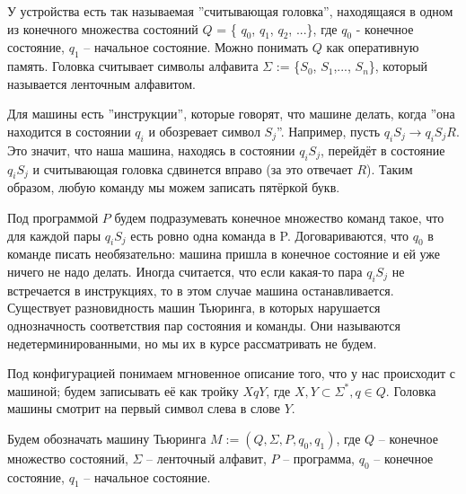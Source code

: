 \par У устройства есть так называемая ''считывающая головка'',  находящаяся в одном из конечного множества
состояний $Q$ = \{ $q_{0}$, $q_{1}$, $q_{2}$, ...\}, где $q_{0}$ - конечное состояние, $q_{1}$ -- начальное
состояние. Можно понимать $Q$ как оперативную память. Головка считывает символы алфавита $\Sigma$ := \{$S_{0}$,
$S_{1}$,..., $S_{n}$\}, который называется ленточным алфавитом. 
\par Для машины есть ''инструкции'', которые говорят, что машине делать, когда ''она находится в состоянии $q_{i}$
и обозревает символ $S_{j}$''. Например, пусть $q_{i}S_{j} \to q_{i}S_{j}R$. Это значит, что наша машина,
находясь в состоянии $q_{i}S_{j}$, перейдёт в состояние $q_{i}S_{j}$ и считывающая головка сдвинется вправо (за это
отвечает $R$). Таким образом, любую команду мы можем записать пятёркой букв. 
\par Под программой $P$ будем подразумевать конечное множество команд такое, что для каждой пары $q_{i}S_{j}$ есть
ровно одна команда в P. Договариваются, что $q_{0}$ в команде писать необязательно: машина пришла в конечное
состояние и ей уже ничего не надо делать. Иногда считается, что если какая-то пара $q_{i}S_{j}$ не встречается в
инструкциях, то в этом случае машина останавливается. Существует  разновидность машин Тьюринга, в которых
нарушается однозначность соответствия пар состояния и команды. Они называются недетерминированными, но мы их в
курсе рассматривать не будем.
\par Под конфигурацией понимаем мгновенное описание того, что у нас происходит с машиной; будем записывать её как
тройку $XqY$, где $X, Y \subset \Sigma^*, q \in Q$. Головка машины смотрит на первый символ слева в слове $Y$.
\par Будем обозначать машину Тьюринга $M:=(Q, \Sigma, P, q_{0}, q_{1})$, где $Q$ -- конечное множество состояний,
$\Sigma$ -- ленточный алфавит, $P$ -- программа, $q_{0}$ -- конечное состояние, $q_{1}$ -- начальное состояние.
